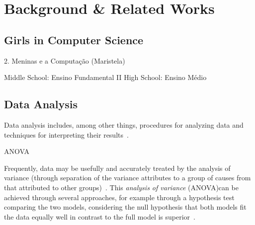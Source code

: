 \section{Background \& Related Works}\label{sec:background}%

\subsection{Girls in Computer Science}\label{subsec:background:girls}%
2. Meninas e a Computação (Maristela)

Middle School: Ensino Fundamental II
High School: Ensino Médio

\subsection{Data Analysis}\label{subsec:background:data}%

Data analysis includes, among other things, procedures for analyzing data and techniques for interpreting their results~\cite{Tukey1962}.

%
ANOVA ~\cite{Hastie2009}


Frequently, data may be usefully and accurately treated by the analysis of variance (through separation of the variance attributes to a group of causes from that attributed to other groups)~\cite{Fisher1934}. This \emph{analysis of variance} (ANOVA)can be achieved through several approaches, for example through a hypothesis test comparing the two models, considering the null hypothesis that both models fit the data equally well in contrast to  the full model is superior~\cite{James2013}.

%

